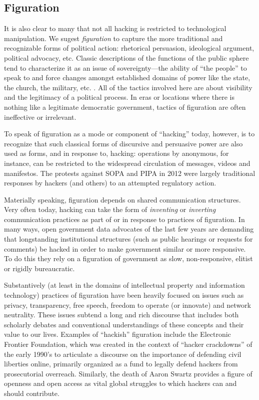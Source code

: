 \documentclass[10pt,letter,oneside]{scrartcl}
\begin{document}
\subsection*{Figuration}

It is also clear to many that not all hacking is restricted to technological
manipulation. We sugest \emph{figuration} to capture the more traditional and
recognizable forms of political action: rhetorical persuasion, ideological
argument, political advocacy, etc.  Classic descriptions of the functions of the
public sphere tend to characterize it as an issue of sovereignty---the ability
of ``the people'' to speak to and force changes amongst established domains of
power like the state, the church, the military, etc. \cite{anderson2006imagined}.  
All of the tactics involved here are about visibility and the legitimacy of a 
political process.  In eras or locations where there is nothing like a legitimate democratic government, tactics of figuration are often ineffective or irrelevant.

To speak of figuration as a mode or component of ``hacking'' today, however, is
to recognize that such classical forms of discursive and persuasive power are
also used as forms, and in response to, hacking: operations by anonymous, for
instance, can be restricted to the widespread circulation of messages, videos
and manifestos. The protests against SOPA and PIPA in 2012 were largely
traditional responses by hackers (and others) to an attempted regulatory 
action.

Materially speaking, figuration depends on shared communication structures. Very
often today, hacking can take the form of \emph{inventing} or \emph{inverting}
communication practices as part of or in response to practices of figuration.
In many ways, open government data advocates of the last few years are demanding
that longstanding institutional structures (such as public hearings or requests
for comments) be hacked in order to make government similar or more responsive.
To do this they rely on a figuration of government as slow, non-responsive,
elitist or rigidly bureaucratic.

Substantively (at least in the domains of intellectual property and information
technology) practices of figuration have been heavily focused on issues such as
privacy, transparency, free speech, freedom to operate (or innovate) and network
neutrality.  These issues subtend a long and rich discourse that includes both
scholarly debates and conventional understandings of these concepts and their
value to our lives.  Examples of ``hackish'' figuration include the Electronic
Frontier Foundation, which was created in the context of ``hacker crackdowns''
of the early 1990's to articulate a discourse on the importance of defending
civil liberties online, primarily organized as a fund to legally defend hackers
from prosecutorial overreach.  Similarly, the death of Aaron Swartz provides a
figure of openness and open access as vital global struggles to which hackers
can and should contribute.
\end{document}
